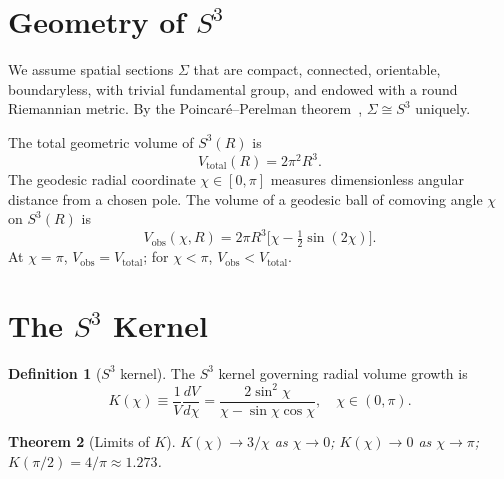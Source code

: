 \documentclass[12pt,a4paper]{amsart}
\theoremstyle{plain}
\newtheorem{theorem}{Theorem}[section]
\theoremstyle{definition}
\newtheorem{definition}[theorem]{Definition}
\theoremstyle{remark}
\newcommand{\Sthree}{S^3}
\newcommand{\half}{\tfrac{1}{2}}
\newcommand{\Vtot}{V_{\mathrm{total}}}
\newcommand{\Vobs}{V_{\mathrm{obs}}}
\begin{document}
\section{Geometry of $S^3$}
\label{sec:geom}

We assume spatial sections $\Sigma$ that are compact, connected,
orientable, boundaryless, with trivial fundamental group, and
endowed with a round Riemannian metric. By the Poincar\'e--Perelman
theorem~\cite{Perelman2002,Perelman2003a,Perelman2003b},
$\Sigma\cong\Sthree$ uniquely.

The total geometric volume of $\Sthree(R)$ is
\begin{equation}
  \Vtot(R) = 2\pi^2 R^3.
  \label{eq:Vtot}
\end{equation}
The geodesic radial coordinate $\chi\in[0,\pi]$ measures dimensionless
angular distance from a chosen pole. The volume of a geodesic ball
of comoving angle $\chi$ on $\Sthree(R)$ is
\begin{equation}
  \Vobs(\chi, R) = 2\pi R^3\bigl[\chi - \half\sin(2\chi)\bigr].
  \label{eq:Vobs}
\end{equation}
At $\chi=\pi$, $\Vobs=\Vtot$; for $\chi<\pi$, $\Vobs<\Vtot$.

\medskip
\begin{center}
\fbox{\quad$\Vobs \neq \Vtot$\quad}
\end{center}

\section{The $S^3$ Kernel}
\label{sec:kernel}

\begin{definition}[$\Sthree$ kernel]
  \label{def:K}
  The $\Sthree$ kernel governing radial volume growth is
  \begin{equation}
    K(\chi) \equiv \frac{1}{V}\frac{dV}{d\chi}
       = \frac{2\sin^2\!\chi}{\chi - \sin\chi\cos\chi},
    \quad \chi\in(0,\pi).
    \label{eq:Kdef}
  \end{equation}
\end{definition}

\begin{theorem}[Limits of $K$]
  \label{thm:Klimits}
  $K(\chi)\to 3/\chi$ as $\chi\to 0$;
  $K(\chi)\to 0$ as $\chi\to\pi$;
  $K(\pi/2) = 4/\pi\approx 1.273$.
\end{theorem}
\end{document}
